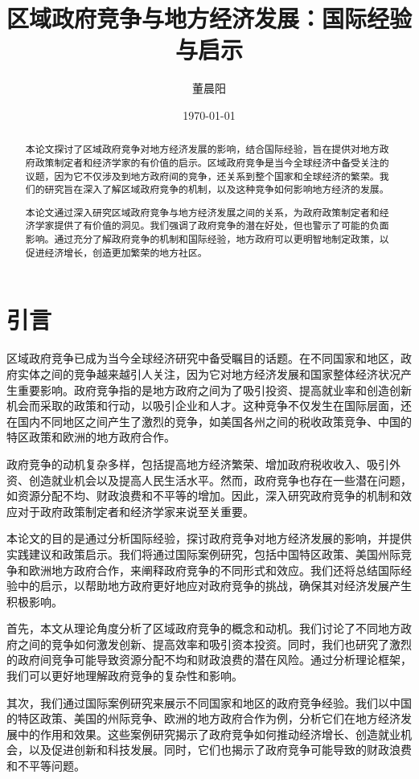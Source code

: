 \documentclass[a4paper,12pt]{ctexart}
\title{区域政府竞争与地方经济发展：国际经验与启示}
\author{董晨阳}
\date{\today}
\begin{document}
\maketitle
\begin{abstract}
    本论文探讨了区域政府竞争对地方经济发展的影响，结合国际经验，旨在提供对地方政府政策制定者和经济学家的有价值的启示。区域政府竞争是当今全球经济中备受关注的议题，因为它不仅涉及到地方政府间的竞争，还关系到整个国家和全球经济的繁荣。我们的研究旨在深入了解区域政府竞争的机制，以及这种竞争如何影响地方经济的发展。

    本论文通过深入研究区域政府竞争与地方经济发展之间的关系，为政府政策制定者和经济学家提供了有价值的洞见。我们强调了政府竞争的潜在好处，但也警示了可能的负面影响。通过充分了解政府竞争的机制和国际经验，地方政府可以更明智地制定政策，以促进经济增长，创造更加繁荣的地方社区。
\end{abstract}
\section*{引言}
区域政府竞争已成为当今全球经济研究\citep{陈云贤2017区域政府竞争}中备受瞩目的话题。在不同国家和地区，政府实体之间的竞争越来越引人关注，因为它对地方经济发展和国家整体经济状况产生重要影响。政府竞争指的是地方政府之间为了吸引投资、提高就业率和创造创新机会而采取的政策和行动，以吸引企业和人才。这种竞争不仅发生在国际层面，还在国内不同地区之间产生了激烈的竞争，如美国各州之间的税收政策竞争、中国的特区政策和欧洲的地方政府合作。

政府竞争的动机复杂多样，包括提高地方经济繁荣、增加政府税收收入、吸引外资、创造就业机会以及提高人民生活水平。然而，政府竞争也存在一些潜在问题，如资源分配不均、财政浪费和不平等的增加。因此，深入研究政府竞争的机制和效应对于政府政策制定者和经济学家来说至关重要。

本论文的目的是通过分析国际经验，探讨政府竞争对地方经济发展的影响，并提供实践建议和政策启示。我们将通过国际案例研究，包括中国特区政策、美国州际竞争和欧洲地方政府合作，来阐释政府竞争的不同形式和效应。我们还将总结国际经验中的启示，以帮助地方政府更好地应对政府竞争的挑战，确保其对经济发展产生积极影响。

首先，本文从理论角度分析了区域政府竞争的概念和动机。我们讨论了不同地方政府之间的竞争如何激发创新、提高效率和吸引资本投资。同时，我们也研究了激烈的政府间竞争可能导致资源分配不均和财政浪费的潜在风险。通过分析理论框架，我们可以更好地理解政府竞争的复杂性和影响。

其次，我们通过国际案例研究来展示不同国家和地区的政府竞争经验。我们以中国的特区政策、美国的州际竞争、欧洲的地方政府合作为例，分析它们在地方经济发展中的作用和效果。这些案例研究揭示了政府竞争如何推动经济增长、创造就业机会，以及促进创新和科技发展。同时，它们也揭示了政府竞争可能导致的财政浪费和不平等问题。
\end{document}
